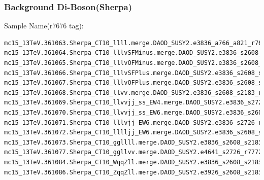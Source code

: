 \documentclass[mathserif,serif]{beamer}
\begin{document}
\begin{frame}[fragile]
\frametitle{Background Di-Boson(Sherpa)}
\small
Sample Name(r7676 tag):
\tiny
\begin{verbatim}
mc15_13TeV.361063.Sherpa_CT10_llll.merge.DAOD_SUSY2.e3836_a766_a821_r7676_p2666/
mc15_13TeV.361064.Sherpa_CT10_lllvSFMinus.merge.DAOD_SUSY2.e3836_s2608_s2183_r7725_r7676_p2666/
mc15_13TeV.361065.Sherpa_CT10_lllvOFMinus.merge.DAOD_SUSY2.e3836_s2608_s2183_r7725_r7676_p2666/
mc15_13TeV.361066.Sherpa_CT10_lllvSFPlus.merge.DAOD_SUSY2.e3836_s2608_s2183_r7725_r7676_p2666/
mc15_13TeV.361067.Sherpa_CT10_lllvOFPlus.merge.DAOD_SUSY2.e3836_s2608_s2183_r7725_r7676_p2666/
mc15_13TeV.361068.Sherpa_CT10_llvv.merge.DAOD_SUSY2.e3836_s2608_s2183_r7725_r7676_p2666/
mc15_13TeV.361069.Sherpa_CT10_llvvjj_ss_EW4.merge.DAOD_SUSY2.e3836_s2726_r7772_r7676_p2666/
mc15_13TeV.361070.Sherpa_CT10_llvvjj_ss_EW6.merge.DAOD_SUSY2.e3836_s2608_r7772_r7676_p2666/
mc15_13TeV.361071.Sherpa_CT10_lllvjj_EW6.merge.DAOD_SUSY2.e3836_s2726_r7772_r7676_p2666/
mc15_13TeV.361072.Sherpa_CT10_lllljj_EW6.merge.DAOD_SUSY2.e3836_s2608_s2183_r7772_r7676_p2666/
mc15_13TeV.361073.Sherpa_CT10_ggllll.merge.DAOD_SUSY2.e3836_s2608_s2183_r7772_r7676_p2666/
mc15_13TeV.361077.Sherpa_CT10_ggllvv.merge.DAOD_SUSY2.e4641_s2726_r7772_r7676_p2666/
mc15_13TeV.361084.Sherpa_CT10_WqqZll.merge.DAOD_SUSY2.e3836_s2608_s2183_r7772_r7676_p2666/
mc15_13TeV.361086.Sherpa_CT10_ZqqZll.merge.DAOD_SUSY2.e3926_s2608_s2183_r7772_r7676_p2666/
\end{verbatim}
\end{frame}
\end{document}
